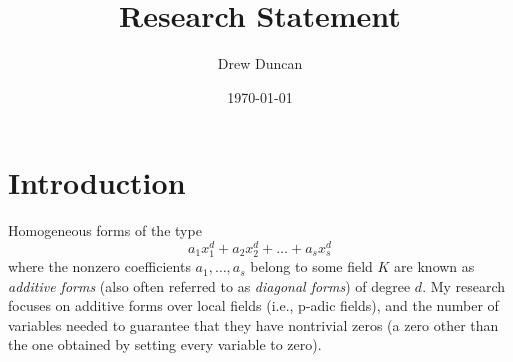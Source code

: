 \documentclass{article}
\title{Research Statement}
\author{Drew Duncan}
\date{\today}
\begin{document}
\maketitle












\section{Introduction}

Homogeneous forms of the type
\begin{equation}
\label{eq}
a_1x_1^d + a_2x_2^d + \ldots + a_sx_s^d
\end{equation} where the nonzero coefficients $a_1, \ldots, a_s$ belong to some field $K$ are known as \textit{additive forms} (also often referred to as \textit{diagonal forms}) of degree $d$.  My research focuses on additive forms over local fields (i.e., p-adic fields), and the number of variables needed to guarantee that they have nontrivial zeros (a zero other than the one obtained by setting every variable to zero).
\end{document}
